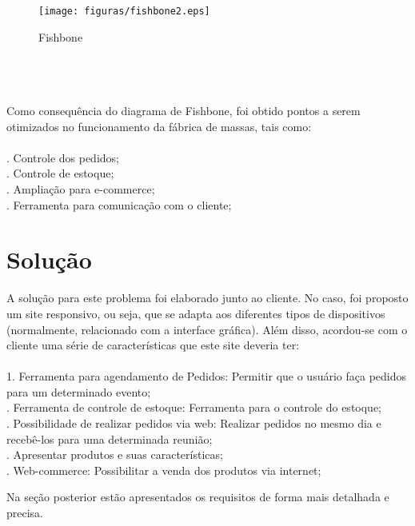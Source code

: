 \begin{figure}[h]
    \centering
    \label{fig01}
        \texttt{[image: figuras/fishbone2.eps]}
    \caption{Fishbone}
\end{figure}

\tab \\ \\ \\

Como consequência do diagrama de Fishbone, foi obtido pontos a serem otimizados no funcionamento da fábrica de massas, tais como:\\ \\
. Controle dos pedidos;\\
. Controle de estoque;\\
. Ampliação para e-commerce;\\
. Ferramenta para comunicação com o cliente;\\

{\large {\section { Solução \\ } } }

A solução para este problema foi elaborado junto ao cliente. No caso, foi proposto um site responsivo, ou seja, que se adapta aos diferentes tipos de dispositivos (normalmente, relacionado com a interface gráfica).  Além disso, acordou-se com o cliente uma série de características que este site deveria ter:\\ \\

1. Ferramenta para agendamento de Pedidos: Permitir que o usuário faça pedidos para um determinado evento;\\
. Ferramenta de controle de estoque: Ferramenta para o controle do estoque;\\
. Possibilidade de realizar pedidos via web: Realizar pedidos no mesmo dia e recebê-los para uma determinada reunião;\\
. Apresentar produtos e suas características;\\
. Web-commerce: Possibilitar a venda dos produtos  via internet;

Na seção posterior estão apresentados os requisitos de forma mais detalhada e precisa.

